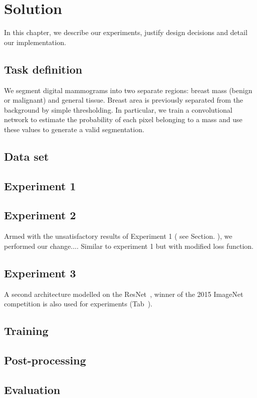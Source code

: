 \chapter{Solution}
\label{ch:Model}

In this chapter, we describe our experiments, justify design decisions and detail our implementation.



\section{Task definition}
We segment digital mammograms into two separate regions: breast mass (benign or malignant) and general tissue.
Breast area is previously separated from the background by simple thresholding.
In particular, we train a convolutional network to estimate the probability of each pixel belonging to a mass and use these values to generate a valid segmentation.

\section{Data set}


\section{Experiment 1}


\section{Experiment 2}
Armed with the unsatisfactory results of Experiment 1 ( see Section. ), we performed our change....
Similar to experiment 1 but with modified loss function.

\section{Experiment 3}
A second architecture modelled on the ResNet~\cite{}, winner of the 2015 ImageNet competition is also used for experiments (Tab~\cite{}).

\section{Training}


\section{Post-processing}


\section{Evaluation}

